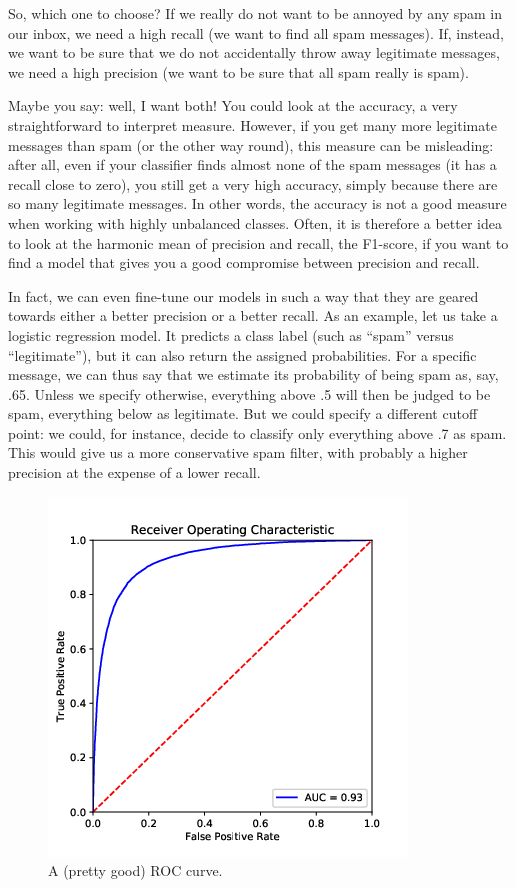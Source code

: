 So, which one to choose?  If we really do not want to be annoyed by
any spam in our inbox, we need a high recall (we want to find all spam
messages). If, instead, we want to be sure that we do not
accidentally throw away legitimate messages, we need a high
precision (we want to be sure that all spam really is spam).

Maybe you say: well, I want both!  You could look at the accuracy, a
very straightforward to interpret measure. However, if you get many
more legitimate messages than spam (or the other way round), this
measure can be misleading: after all, even if your classifier finds
almost none of the spam messages (it has a recall close to zero), you
still get a very high accuracy, simply because there are so many
legitimate messages. In other words, the accuracy is not a good measure when working with highly unbalanced classes.
Often, it is therefore a better idea to look at the harmonic mean of
precision and recall, the F1-score, if you want to find a model that
gives you a good compromise between precision and recall.


In fact, we can even fine-tune our models in such a way that they are
geared towards either a better precision or a better recall.
As an example, let us take a logistic regression model. It predicts a
class label (such as ``spam'' versus ``legitimate''), but it can also
return the assigned probabilities. For a specific message, we can thus
say that we estimate its probability of being spam as, say, .65.
Unless we specify otherwise, everything above .5 will then be judged
to be spam, everything below as legitimate. But we could specify a
different cutoff point: we could, for instance, decide to classify
only everything above .7 as spam. This would give us a more
conservative spam filter, with probably a higher precision at the
expense of a lower recall.

\begin{figure} 
\centering
\includegraphics[width=0.4\linewidth]{figures/ch09_roccurve}
\caption{A (pretty good) ROC curve.}
\label{fig:roccurve}
\end{figure}

